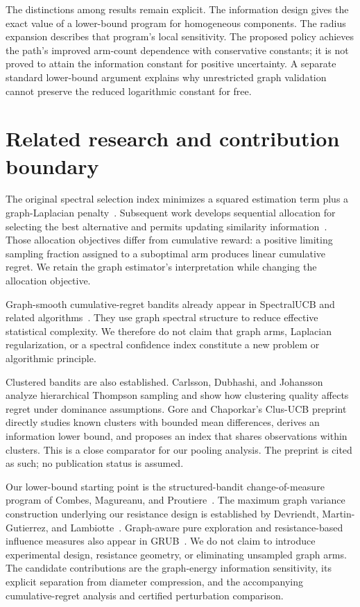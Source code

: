 \documentclass[11pt]{article}
\begin{document}
The distinctions among results remain explicit. The information design gives the exact value of a lower-bound program for homogeneous components. The radius expansion describes that program's local sensitivity. The proposed policy achieves the path's improved arm-count dependence with conservative constants; it is not proved to attain the information constant for positive uncertainty. A separate standard lower-bound argument explains why unrestricted graph validation cannot preserve the reduced logarithmic constant for free.

\section{Related research and contribution boundary}
The original spectral selection index minimizes a squared estimation term plus a graph-Laplacian penalty~\cite{sun2019}. Subsequent work develops sequential allocation for selecting the best alternative and permits updating similarity information~\cite{zhou2024}. Those allocation objectives differ from cumulative reward: a positive limiting sampling fraction assigned to a suboptimal arm produces linear cumulative regret. We retain the graph estimator's interpretation while changing the allocation objective.

Graph-smooth cumulative-regret bandits already appear in SpectralUCB and related algorithms~\cite{valko2014,kocak2020}. They use graph spectral structure to reduce effective statistical complexity. We therefore do not claim that graph arms, Laplacian regularization, or a spectral confidence index constitute a new problem or algorithmic principle.

Clustered bandits are also established. Carlsson, Dubhashi, and Johansson~\cite{carlsson2021} analyze hierarchical Thompson sampling and show how clustering quality affects regret under dominance assumptions. Gore and Chaporkar's Clus-UCB preprint~\cite{gore2025} directly studies known clusters with bounded mean differences, derives an information lower bound, and proposes an index that shares observations within clusters. This is a close comparator for our pooling analysis. The preprint is cited as such; no publication status is assumed.

Our lower-bound starting point is the structured-bandit change-of-measure program of Combes, Magureanu, and Proutiere~\cite{combes2017}. The maximum graph variance construction underlying our resistance design is established by Devriendt, Martin-Gutierrez, and Lambiotte~\cite{devriendt2022}. Graph-aware pure exploration and resistance-based influence measures also appear in GRUB~\cite{thaker2022}. We do not claim to introduce experimental design, resistance geometry, or eliminating unsampled graph arms. The candidate contributions are the graph-energy information sensitivity, its explicit separation from diameter compression, and the accompanying cumulative-regret analysis and certified perturbation comparison.
\end{document}
